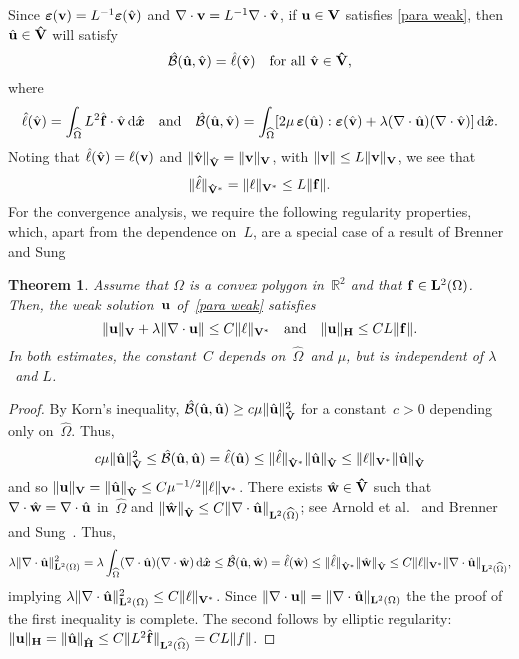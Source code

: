 \documentclass[11pt]{article}
\newcommand{\calBhat}{\hat{\mathcal{B}}}
\newcommand{\vf}{{\bf f}}
\newcommand{\vu}{{\bf u}}
\newcommand{\vv}{{\bf v}}
\newcommand{\vV}{{\bf V}}
\newcommand{\vH}{{\bf H}}
\newcommand{\vVhat}{\mathbf{\hat V}}
\newcommand{\vHhat}{\mathbf{\hat H}}
\newcommand{\vw}{{\bf w}}
\newcommand{\bsx}{{\boldsymbol{x}}}
\numberwithin{equation}{section}
\newcommand{\veps}{{\boldsymbol{\varepsilon}}}
\newcommand{\ud}{\mathrm{d}}
\newtheorem{theorem}{Theorem}[section]
\begin{document}
Since $\veps(\vv)=L^{-1}\veps(\hat\vv)$ and
$\nabla\cdot\vv=L^{-1}\nabla\cdot\hat\vv$, if $\vu\in\vV$ satisfies
\eqref{para weak}, then $\hat\vu\in\vVhat$ will
satisfy
\[
\calBhat(\hat\vu,\hat\vv)=\hat\ell(\hat\vv)
\quad\text{for all $\hat\vv\in\vVhat$,}
\]
where
\begin{equation}\label{eq: ell B hat}
\hat\ell(\hat\vv) = \int_{\widehat\Omega}L^2\hat\vf\cdot\hat\vv\,\ud\hat\bsx
\quad\text{and}\quad
\calBhat(\hat\vu,\hat\vv)=\int_{\widehat\Omega}
[2\mu\,\veps(\hat\vu):\veps(\hat\vv)+\lambda(\nabla\cdot\hat\vu)
    (\nabla\cdot\hat\vv)]\,\ud\hat\bsx.
\end{equation}
Noting that $\hat\ell(\hat\vv)=\ell(\vv)$ and
$\|\hat\vv\|_{\vVhat}=\|\vv\|_{\vV}$, with $\|\vv\|\le L\|\vv\|_{\vV}$, we see
that
\begin{equation}\label{eq: norm ell}
\|\hat\ell\|_{\vVhat^*}=\|\ell\|_{\vV^*}\le L\|\vf\|.
\end{equation}
For the convergence analysis, we require the following regularity properties,
which, apart from the dependence on~$L$, are a special case of a result of
Brenner and Sung~\cite[Lemma~2.2]{BrennerSung1992}

\begin{theorem}\label{lem: vu bound}
Assume that $\Omega$ is a convex polygon in~$\mathbb{R}^2$ and that
$\vf\in\mathbf{L}^2(\Omega)$. Then, the weak solution~$\vu$ of~\eqref{para weak}
satisfies
\begin{equation}\label{a priori}
\|\vu\|_{\vV}+\lambda\|\nabla\cdot\vu\|\le C\|\ell\|_{\vV^*}
\quad\text{and}\quad
\|\vu\|_{\vH}\le CL\|\vf\|.
\end{equation}
In both estimates, the constant~$C$ depends on~$\widehat\Omega$~and $\mu$, but
is independent of $\lambda$~and $L$.
\end{theorem}
\begin{proof}
By Korn's inequality, $\calBhat(\hat\vu,\hat\vu)\ge c\mu\|\hat\vu\|_{\vVhat}^2$
for a constant~$c>0$ depending only on~$\widehat\Omega$.  Thus,
\[
c\mu\|\hat\vu\|_{\vVhat}^2\le\calBhat(\hat\vu,\hat\vu)=\hat\ell(\hat\vu)
    \le\|\hat\ell\|_{\vVhat^*}\|\hat\vu\|_{\vVhat}
    \le\|\ell\|_{\vV^*}\|\hat\vu\|_{\vVhat}
\]
and so $\|\vu\|_{\vV}=\|\hat\vu\|_{\vVhat}\le C\mu^{-1/2}\|\ell\|_{\vV^*}$.
There exists $\hat\vw\in\vVhat$ such that
$\nabla\cdot\hat\vw=\nabla\cdot\hat\vu$ in~$\widehat\Omega$ and
$\|\hat\vw\|_{\vVhat}
\le C\|\nabla\cdot\hat\vu\|_{\mathbf{L}^2(\widehat\Omega)}$; see Arnold et
al.~\cite[Theorem~3.1]{ArnoldEtAl1988} and Brenner and
Sung~\cite[Lemma~2.1]{BrennerSung1992}.  Thus,
\[
\lambda\|\nabla\cdot\hat\vu\|_{\mathbf{L}^2(\Omega)}^2
=\lambda\int_{\widehat\Omega}
    (\nabla\cdot\hat\vu)(\nabla\cdot\hat\vw)\,\ud\hat\bsx
\le\calBhat(\hat\vu,\hat\vw)=\hat\ell(\hat\vw)
\le\|\hat\ell\|_{\vVhat^*}\|\hat\vw\|_{\vVhat}
\le C\|\ell\|_{\vV^*}\|\nabla\cdot\hat\vu\|_{\mathbf{L}^2(\widehat\Omega)},
\]
implying $\lambda\|\nabla\cdot\hat\vu\|_{\mathbf{L}^2(\Omega)}^2
\le C\|\ell\|_{\vV^*}$. Since $\|\nabla\cdot\vu\|=
\|\nabla\cdot\hat\vu\|_{\mathbf{L}^2(\Omega)}$ the the proof of the first
inequality is complete.  The second follows by elliptic regularity:
$\|\vu\|_{\vH}=\|\hat\vu\|_{\vHhat}
\le C\|L^2\hat\vf\|_{\mathbf{L}^2(\widehat\Omega)}=CL\|f\|$.
\end{proof}
\end{document}
